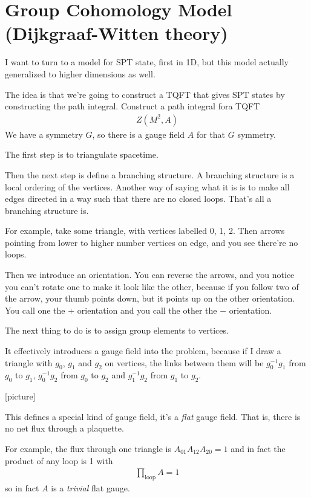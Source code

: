 \section{Group Cohomology Model (Dijkgraaf-Witten theory)}
I want to turn to a model for SPT state,
first in 1D,
but this model actually generalized to higher dimensions as well.

The idea is that we're going to construct a TQFT that gives SPT states
by constructing the path integral.
Construct a path integral fora TQFT
\begin{align}
    Z(M^2, A)
\end{align}
We have a symmetry $G$, so there is a gauge field $A$ for that $G$ symmetry.

The first step is to triangulate spacetime.

Then the next step is define a branching structure.
A branching structure is a local ordering of the vertices.
Another way of saying what it is is to make all edges directed in a way such
that there are no closed loops.
That's all a branching structure is.

For example, take some triangle,
with vertices labelled 0, 1, 2.
Then arrows pointing from lower to higher number vertices on edge,
and you see there're no loops.

Then we introduce an orientation.
You can reverse the arrows,
and you notice you can't rotate one to make it look like the other,
because if you follow two of the arrow,
your thumb points down,
but it points up on the other orientation.
You call one the $+$ orientation and you call the other the $-$ orientation.

The next thing to do is to assign group elements to vertices.

It effectively introduces a gauge field into the problem,
because if I draw a triangle with
$g_0$, $g_1$ and $g_2$ on vertices,
the links between them will be $g_0^{-1}g_1$ from $g_0$ to $g_1$,
$g_{0}^{-1}g_2$ from $g_0$ to $g_2$ and
$g_1^{-1}g_2$ from $g_1$ to $g_2$.

[picture]

This defines a special kind of gauge field,
it's a \emph{flat} gauge field.
That is,
there is no net flux through a plaquette.

For example,
the flux through one triangle is
$A_{01}A_{12}A_{20}=1$
and in fact the product of any loop is 1 with
\begin{align}
    \prod_{\textrm{loop}} A = 1
\end{align}
so in fact $A$ is a \emph{trivial} flat gauge.

